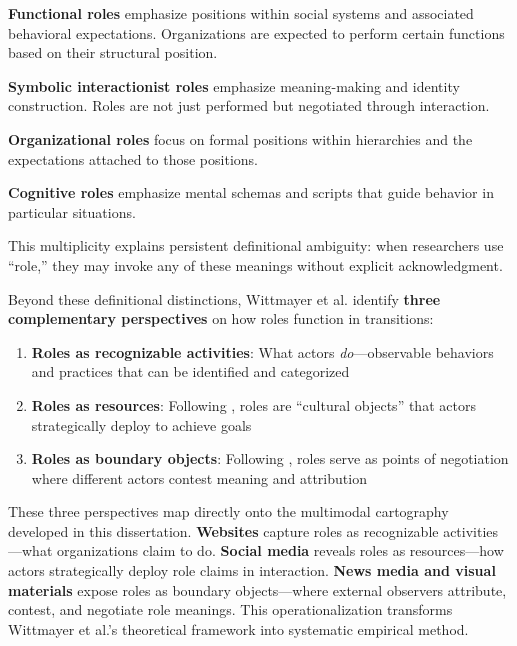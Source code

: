 \documentclass[../main.tex]{subfiles}
\begin{document}
\textbf{Functional roles} emphasize positions within social systems and associated behavioral expectations. Organizations are expected to perform certain functions based on their structural position.

\textbf{Symbolic interactionist roles} emphasize meaning-making and identity construction. Roles are not just performed but negotiated through interaction.

\textbf{Organizational roles} focus on formal positions within hierarchies and the expectations attached to those positions.

\textbf{Cognitive roles} emphasize mental schemas and scripts that guide behavior in particular situations.

This multiplicity explains persistent definitional ambiguity: when researchers use ``role,'' they may invoke any of these meanings without explicit acknowledgment.

Beyond these definitional distinctions, Wittmayer et al. identify \textbf{three complementary perspectives} on how roles function in transitions:

\begin{enumerate}[nosep]
\item \textbf{Roles as recognizable activities}: What actors \emph{do}---observable behaviors and practices that can be identified and categorized
\item \textbf{Roles as resources}: Following \textcite{callero1994limits}, roles are ``cultural objects'' that actors strategically deploy to achieve goals
\item \textbf{Roles as boundary objects}: Following \textcite{simpson2008role}, roles serve as points of negotiation where different actors contest meaning and attribution
\end{enumerate}

These three perspectives map directly onto the multimodal cartography developed in this dissertation. \textbf{Websites} capture roles as recognizable activities---what organizations claim to do. \textbf{Social media} reveals roles as resources---how actors strategically deploy role claims in interaction. \textbf{News media and visual materials} expose roles as boundary objects---where external observers attribute, contest, and negotiate role meanings. This operationalization transforms Wittmayer et al.'s theoretical framework into systematic empirical method.
\end{document}
